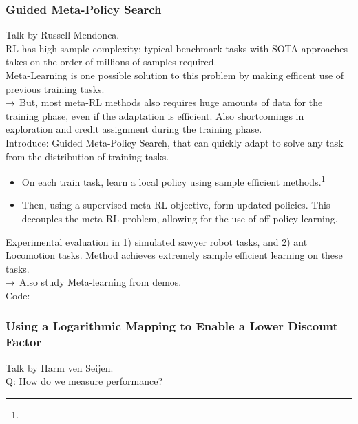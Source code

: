 \subsubsection{Guided Meta-Policy Search}

Talk by Russell Mendonca. \\

RL has high sample complexity: typical benchmark tasks with SOTA approaches takes on the order of millions of samples required. \\

Meta-Learning is one possible solution to this problem by making efficent use of previous training tasks. \\

$\rightarrow$ But, most meta-RL methods also requires huge amounts of data for the training phase, even if the adaptation is efficient. Also shortcomings in exploration and credit assignment during the training phase. \\

Introduce: Guided Meta-Policy Search, that can quickly adapt to solve any task from the distribution of training tasks.
\begin{itemize}
    \item On each train task, learn a local policy using sample efficient methods.\footnote{}
    \item Then, using a supervised meta-RL objective, form updated policies. This decouples the meta-RL problem, allowing for the use of off-policy learning.
\end{itemize}

Experimental evaluation in 1) simulated sawyer robot tasks, and 2) ant Locomotion tasks. Method achieves extremely sample efficient learning on these tasks. \\

$\rightarrow$ Also study Meta-learning from demos. \\

Code: 

\subsubsection{Using a Logarithmic Mapping to Enable a Lower Discount Factor \cite{van2019using}}

Talk by Harm ven Seijen. \\

Q: How do we measure performance? \\

